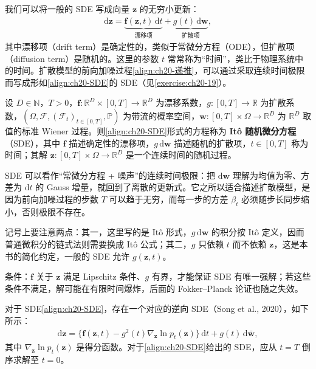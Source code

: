 \documentclass[../../main.tex]{subfiles}
\begin{document}
我们可以将一般的 SDE 写成向量 $\bm{z}$ 的无穷小更新：
\begin{align}
\mathrm{d}\bm{z}=\underbrace{\bm{f}(\bm{z},t)\,\mathrm{d}t}_{\text{漂移项}}+\underbrace{g(t)\,\mathrm{d}\bm{w}}_{\text{扩散项}},
\label{align:ch20-SDE}
\end{align}
其中漂移项（drift term）是确定性的，类似于常微分方程（ODE），但扩散项（diffusion term）是随机的。这里的参数 $t$ 常常称为“时间”，类比于物理系统中的时间。扩散模型的前向加噪过程\eqref{align:ch20-递推}，可以通过采取连续时间极限而写成形如\eqref{align:ch20-SDE}的 SDE（见\cref{exercise:ch20-19}）。

\begin{definition}[随机微分方程]\label{definition:ch20-随机微分方程}
设 $D\in\mathbb{N}$，$T>0$，$\bm{f}:\mathbb{R}^{D}\times[0,T]\to\mathbb{R}^{D}$ 为漂移系数，$g:[0,T]\to\mathbb{R}$ 为扩散系数，$(\Omega,\mathcal{F},(\mathcal{F}_{t})_{t\in[0,T]},\mathbb{P})$ 为带流的概率空间，$\bm{w}:[0,T]\times\Omega\to\mathbb{R}^{D}$ 为 $\mathbb{R}^{D}$ 取值的标准 Wiener 过程。则\eqref{align:ch20-SDE}形式的方程称为 \textbf{It\^o 随机微分方程}（SDE），其中 $\bm{f}$ 描述确定性的漂移项，$g\,\mathrm{d}\bm{w}$ 描述随机的扩散项，$t\in[0,T]$ 称为时间；其解 $\bm{z}:[0,T]\times\Omega\to\mathbb{R}^{D}$ 是一个连续时间的随机过程。
\end{definition}

\begin{remark}
SDE 可以看作“常微分方程 + 噪声”的连续时间极限：把 $\mathrm{d}\bm{w}$ 理解为均值为零、方差为 $\mathrm{d}t$ 的 Gauss 增量，就回到了离散的更新式。它之所以适合描述扩散模型，是因为前向加噪过程的步数 $T$ 可以趋于无穷，而每一步的方差 $\beta_t$ 必须随步长同步缩小，否则极限不存在。\par
记号上要注意两点：其一，这里写的是 It\^o 形式，$g\,\mathrm{d}\bm{w}$ 的积分按 It\^o 定义，因而普通微积分的链式法则需要换成 It\^o 公式；其二，$g$ 只依赖 $t$ 而不依赖 $\bm{z}$，这是本书的简化约定，一般的 SDE 允许 $g(\bm{z},t)$。\par
条件：$\bm{f}$ 关于 $\bm{z}$ 满足 Lipschitz 条件、$g$ 有界，才能保证 SDE 有唯一强解；若这些条件不满足，解可能在有限时间爆炸，后面的 Fokker--Planck 论证也随之失效。
\end{remark}

对于 SDE\eqref{align:ch20-SDE}，存在一个对应的逆向 SDE（Song et al., 2020），如下所示：
\begin{align}
\mathrm{d}\bm{z}=\big\{\bm{f}(\bm{z},t)-g^2(t)\nabla_{\bm{z}}\ln p_t(\bm{z})\big\}\,\mathrm{d}t+g(t)\,\mathrm{d}\bar{\bm{w}},
\label{align:ch20-逆SDE}
\end{align}
其中 $\nabla_{\bm{z}}\ln p_t(\bm{z})$ 是得分函数。对于\eqref{align:ch20-SDE}给出的 SDE，应从 $t=T$ 倒序求解至 $t=0$。
\end{document}
